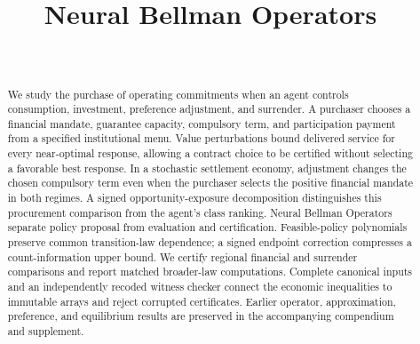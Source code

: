 \documentclass[ecta]{econsocart}
\begin{document}
\begin{frontmatter}
\title{Neural Bellman Operators}
\begin{aug}
\author[id=au1,addressref={add1}]{~}
\address[id=add1]{,}
\end{aug}
\begin{abstract}
We study the purchase of operating commitments when an agent controls consumption, investment, preference adjustment, and surrender. A purchaser chooses a financial mandate, guarantee capacity, compulsory term, and participation payment from a specified institutional menu. Value perturbations bound delivered service for every near-optimal response, allowing a contract choice to be certified without selecting a favorable best response. In a stochastic settlement economy, adjustment changes the chosen compulsory term even when the purchaser selects the positive financial mandate in both regimes. A signed opportunity-exposure decomposition distinguishes this procurement comparison from the agent's class ranking. Neural Bellman Operators separate policy proposal from evaluation and certification. Feasible-policy polynomials preserve common transition-law dependence; a signed endpoint correction compresses a count-information upper bound. We certify regional financial and surrender comparisons and report matched broader-law computations. Complete canonical inputs and an independently recoded witness checker connect the economic inequalities to immutable arrays and reject corrupted certificates. Earlier operator, approximation, preference, and equilibrium results are preserved in the accompanying compendium and supplement.
\end{abstract}
\begin{keyword}
\end{keyword}
\end{frontmatter}


\end{document}
